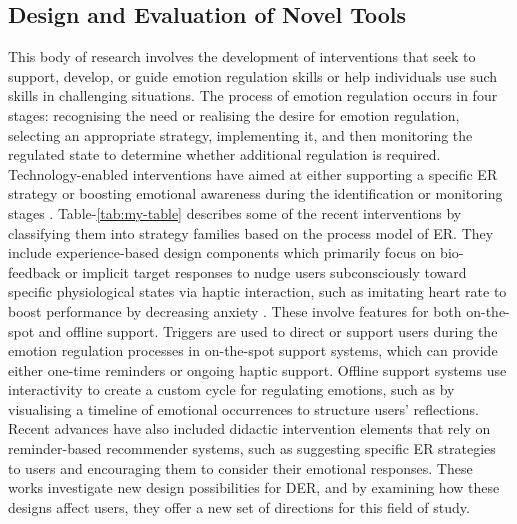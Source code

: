 \documentclass[lettersize,journal]{IEEEtran}
\begin{document}
\subsection{Design and Evaluation of Novel Tools}
This body of research involves the development of interventions that seek to support, develop, or guide emotion regulation skills or help individuals use such skills in challenging situations. The process of emotion regulation occurs in four stages: recognising the need or realising the desire for emotion regulation, selecting an appropriate strategy, implementing it, and then monitoring the regulated state to determine whether additional regulation is required. Technology-enabled interventions have aimed at either supporting a specific ER strategy or boosting emotional awareness during the identification or monitoring stages \cite{slovak2022designing}. 
Table-\ref{tab:my-table} describes some of the recent interventions by classifying them into strategy families based on the process model of ER.
They include experience-based design components which primarily focus on bio-feedback or implicit target responses to nudge users subconsciously toward specific physiological states via haptic interaction, such as imitating heart rate to boost performance by decreasing anxiety \cite{smith2022digital}. These involve features for both on-the-spot and offline support. Triggers are used to direct or support users during the emotion regulation processes in on-the-spot support systems, which can provide either one-time reminders or ongoing haptic support. Offline support systems use interactivity to create a custom cycle for regulating emotions, such as by visualising a timeline of emotional occurrences to structure users' reflections. Recent advances have also included didactic intervention elements that rely on reminder-based recommender systems, such as suggesting specific ER strategies to users and encouraging them to consider their emotional responses. These works investigate new design possibilities for DER, and by examining how these designs affect users, they offer a new set of directions for this field of study.
\vspace{-0.15cm}
\end{document}
